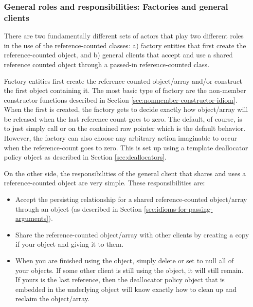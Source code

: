 \documentclass[pdf,ps2pdf,11pt]{SANDreport}
\begin{document}
%
{}\subsubsection{General roles and responsibilities: Factories and
general clients}
%

There are two fundamentally different sets of actors that play two
different roles in the use of the reference-counted classes: a)
factory entities that first create the reference-counted object, and
b) general clients that accept and use a shared reference counted
object through a passed-in reference-counted class.

Factory entities first create the reference-counted object/array
and/or construct the first {} object containing it.
The most basic type of factory are the non-member constructor
functions described in Section
{}\ref{sec:nonmember-constructor-idiom}.  When the first
{} is created, the factory gets to decide
exactly how object/array will be released when the last reference
count goes to zero.  The default, of course, is to just simply call
{} or {} on the contained raw pointer
which is the default behavior.  However, the factory can also choose
any arbitrary action imaginable to occur when the reference-count goes
to zero.  This is set up using a template deallocator policy object as
described in Section {}\ref{sec:deallocators}.

On the other side, the responsibilities of the general client that
shares and uses a reference-counted object are very simple.  These
responsibilities are:

\begin{itemize}

{}\item Accept the persisting relationship for a shared
reference-counted object/array through an {} object
(as described in Section {}\ref{sec:idioms-for-passing-arguments}).

{}\item Share the reference-counted object/array with other clients by
creating a copy if your {} object and giving it to
them.

{}\item When you are finished using the object, simply delete or set
to null all of your {} objects.  If some other
client is still using the object, it will still remain.  If yours is
the last reference, then the deallocator policy object that is
embedded in the underlying {} object will know
exactly how to clean up and reclaim the object/array.

\end{itemize}
\end{document}
